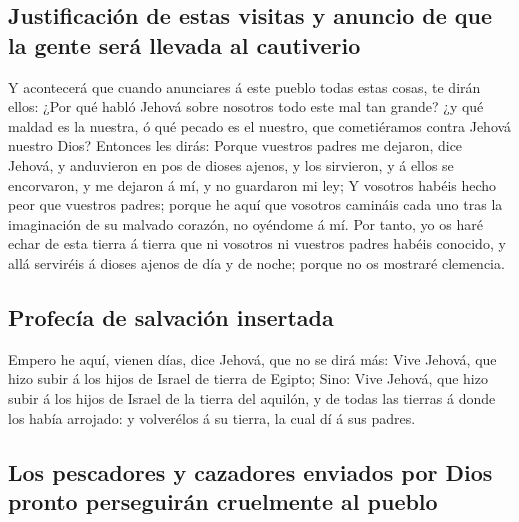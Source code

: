 \hypertarget{justificaciuxf3n-de-estas-visitas-y-anuncio-de-que-la-gente-seruxe1-llevada-al-cautiverio}{%
\subsection{Justificación de estas visitas y anuncio de que la gente
será llevada al
cautiverio}\label{justificaciuxf3n-de-estas-visitas-y-anuncio-de-que-la-gente-seruxe1-llevada-al-cautiverio}}

 Y acontecerá que cuando anunciares á este pueblo todas
estas cosas, te dirán ellos: ¿Por qué habló Jehová sobre nosotros todo
este mal tan grande? ¿y qué maldad es la nuestra, ó qué pecado es el
nuestro, que cometiéramos contra Jehová nuestro Dios? 
Entonces les dirás: Porque vuestros padres me dejaron, dice Jehová, y
anduvieron en pos de dioses ajenos, y los sirvieron, y á ellos se
encorvaron, y me dejaron á mí, y no guardaron mi ley;  Y
vosotros habéis hecho peor que vuestros padres; porque he aquí que
vosotros camináis cada uno tras la imaginación de su malvado corazón, no
oyéndome á mí.  Por tanto, yo os haré echar de esta tierra
á tierra que ni vosotros ni vuestros padres habéis conocido, y allá
serviréis á dioses ajenos de día y de noche; porque no os mostraré
clemencia.

\hypertarget{profecuxeda-de-salvaciuxf3n-insertada}{%
\subsection{Profecía de salvación
insertada}\label{profecuxeda-de-salvaciuxf3n-insertada}}

 Empero he aquí, vienen días, dice Jehová, que no se dirá
más: Vive Jehová, que hizo subir á los hijos de Israel de tierra de
Egipto;  Sino: Vive Jehová, que hizo subir á los hijos de
Israel de la tierra del aquilón, y de todas las tierras á donde los
había arrojado: y volverélos á su tierra, la cual dí á sus padres.

\hypertarget{los-pescadores-y-cazadores-enviados-por-dios-pronto-perseguiruxe1n-cruelmente-al-pueblo}{%
\subsection{Los pescadores y cazadores enviados por Dios pronto
perseguirán cruelmente al
pueblo}\label{los-pescadores-y-cazadores-enviados-por-dios-pronto-perseguiruxe1n-cruelmente-al-pueblo}}

